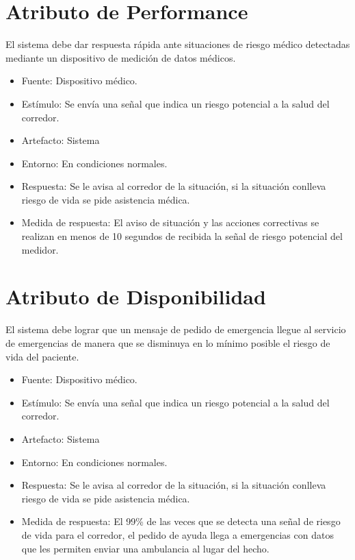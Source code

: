 \section{Atributo de Performance}

El sistema debe dar respuesta rápida ante situaciones de riesgo médico
detectadas mediante un dispositivo de medición de datos médicos.

\begin{itemize}
\itemsep1pt\parskip0pt
\item
  Fuente: Dispositivo médico.
\item
  Estímulo: Se envía una señal que indica un riesgo potencial a la salud
  del corredor.
\item
  Artefacto: Sistema
\item
  Entorno: En condiciones normales.
\item
  Respuesta: Se le avisa al corredor de la situación, si la situación
  conlleva riesgo de vida se pide asistencia médica.
\item
  Medida de respuesta: El aviso de situación y las acciones correctivas
  se realizan en menos de 10 segundos de recibida la señal de riesgo
  potencial del medidor.
\end{itemize}

\section{Atributo de Disponibilidad}

El sistema debe lograr que un mensaje de pedido de emergencia llegue al
servicio de emergencias de manera que se disminuya en lo mínimo posible
el riesgo de vida del paciente.

\begin{itemize}
\itemsep1pt\parskip0pt
\item
  Fuente: Dispositivo médico.
\item
  Estímulo: Se envía una señal que indica un riesgo potencial a la salud
  del corredor.
\item
  Artefacto: Sistema
\item
  Entorno: En condiciones normales.
\item
  Respuesta: Se le avisa al corredor de la situación, si la situación
  conlleva riesgo de vida se pide asistencia médica.
\item
  Medida de respuesta: El 99\% de las veces que se detecta una señal de
  riesgo de vida para el corredor, el pedido de ayuda llega a
  emergencias con datos que les permiten enviar una ambulancia al lugar
  del hecho.
\end{itemize}

